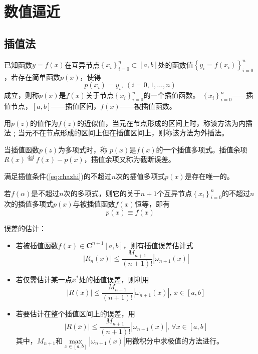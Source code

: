 \section{数值逼近}
\subsection{插值法}
\begin{definition}[插值函数]
    已知函数$y = f(x)$在互异节点$\left\{ x_i \right\}_{i = 0}^{n}\subset \left[ a,b \right]$处的函数值$\left\{ y_i = f(x_i) \right\}_{i = 0}^{n}$，若存在简单函数$p(x)$，使得
    \begin{equation}\label{eq:chazhi}
        p(x_i) = y_i,\ (i = 0,1,\dots,n)
    \end{equation}
    成立，则称$p(x)$是$f(x)$关于节点$\left\{ x_i \right\}_{i = 0}^{n}$的一个插值函数。
    $\left\{ x_i \right\}_{i = 0}^{n}$——插值节点，$\left[ a,b \right]$——插值区间，$f(x)$——被插值函数。
\end{definition}
\begin{note}
    用$p(z)$的值作为$f(z)$的近似值，当元在节点形成的区间上时，称该方法为内插法﹔当元不在节点形成的区间上但在插值区间上，则称该方法为外插法。
\end{note}
\begin{note}
    当插值函数$p(z)$为多项式时，称 $p(x)$是$f(x)$的一个插值多项式。插值余项$R(x)\overset{\text{def}}{=}f(x)-p(x)$，插值余项又称为截断误差。
\end{note}
\begin{theorem}[插值多项式的存在惟一性定理]
    满足插值条件(\ref{eq:chazhi})的不超过$n$次的插值多项式$p(x)$是存在唯一的。
\end{theorem}
\begin{corollary}
    若$f(\alpha)$是不超过$n$次的多项式，则它的关于$n+1$个互异节点$\left\{ x_i \right\}_{i = 0}^{n}$的不超过$n$次的插值多项式$p(x)$与被插值函数$f(x)$恒等，即有
    \[
        p(x)\equiv f(x)
    \]
\end{corollary}
\begin{note}
    误差的估计：
    \begin{itemize}
        \item 若被插值函数$f(x)\in \boldsymbol{C}^{n+1}\left[ a,b \right]$，则有插值误差估计式
        \[
            \left| R_{n}(x) \right|\leqslant \dfrac{M_{n+1}}{(n+1)!}\left| \omega_{n+1}(x) \right|
        \]
        \item 若仅需估计某一点$\bar{x}^*$处的插值误差，则利用
        \[
            \left| R(\bar{x}) \right|\leqslant \dfrac{M_{n+1}}{(n+1)!}\left| \omega_{n+1}(\bar{x}) \right|,\,\bar{x} \in \left[ a,b \right]
        \]
        \item 若要估计在整个插值区间上的误差，用
        \[
            \left| R(\bar{x}) \right|\leqslant \dfrac{M_{n+1}}{(n+1)!}\left| \omega_{n+1}(x) \right|,\,\forall x \in \left[ a,b \right]
        \]
        其中，$M_{n+1}$和$\max\limits_{x\in [a,b]} |\omega_{n+1}(x)|$用微积分中求极值的方法进行。
    \end{itemize}
\end{note}
